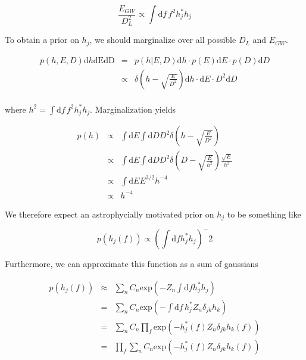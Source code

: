 \documentclass[10pt]{article}
\begin{document}
\begin{equation}
\frac{E_{GW}}{D_L^2} \propto \int\mathrm{d}f\, f^2 h_j^\ast h_j
\end{equation}

To obtain a prior on $h_j$, we should marginalize over all possible $D_L$ and $E_{GW}$.

\begin{eqnarray}
p(h,E,D)\mathrm{d}h\mathrm{dE}\mathrm{dD} & = & p(h|E,D)\mathrm{d}h \cdot p(E)\mathrm{d}E \cdot p(D)\mathrm{d}D \\
                                          & \propto & \delta\left(h-\sqrt{\frac{E}{D^2}}\right)\mathrm{d}h \cdot \mathrm{d}E \cdot D^2 \mathrm{d}D \\
\end{eqnarray}

where $h^2=\int\mathrm{d}f\, f^2 h_j^\ast h_j$. Marginalization yields

\begin{eqnarray}
p(h) & \propto & \int\mathrm{d}E\int\mathrm{d}D D^2 \delta\left(h-\sqrt{\frac{E}{D^2}}\right) \\
     & \propto & \int\mathrm{d}E\int\mathrm{d}D D^2 \delta\left(D-\sqrt{\frac{E}{h^2}}\right)\frac{\sqrt{E}}{h^2} \\
     & \propto & \int\mathrm{d}E E^{3/2} h^{-4} \\
     & \propto & h^{-4}
\end{eqnarray}

We therefore expect an astrophycially motivated prior on $h_j$ to be something like

\begin{equation}
p(h_j(f)) \propto \left(\int\mathrm{d}f h_j^\ast h_j \right)^-2
\end{equation}

Furthermore, we can approximate this function as a sum of gaussians

\begin{eqnarray}
p(h_j(f)) & \approx & \sum\limits_n C_n \mathrm{exp}\left(-Z_n \int\mathrm{d}f h_j^\ast h_j \right) \\
          & = & \sum\limits_n C_n \mathrm{exp}\left(-\int\mathrm{d}f\, h_j^\ast Z_n\delta_{jk} h_k\right) \\
          & = & \sum\limits_n C_n \prod\limits_f \mathrm{exp}\left(-h_j^\ast(f) Z_n\delta_{jk} h_k(f)\right) \\
          & = & \prod\limits_f \sum\limits_n C_n \mathrm{exp}\left(-h_j^\ast(f) Z_n\delta_{jk} h_k(f)\right)
\end{eqnarray}
\end{document}
